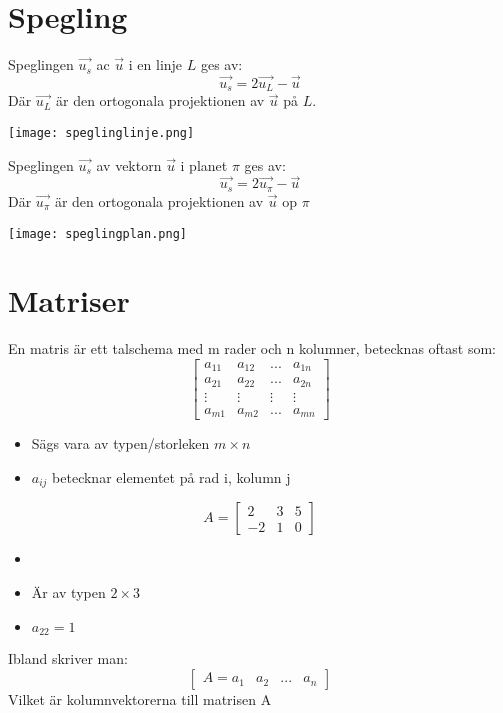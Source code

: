 

\section{Spegling} %
\label{sec:spegling_i_linje}
\begin{Def}
    Speglingen $\vec{u_s}$ ac $\vec{u}$	 i en linje $L$ ges av:
    \[
        \vec{u_s} = 2 \vec{u_L} - \vec{u}
    \]
    Där $\vec{u_L}$ är den ortogonala projektionen av $\vec{u}$ på $L$.
    \begin{center}
    	\texttt{[image: speglinglinje.png]}
    \end{center}
\end{Def}
\begin{Def}
    Speglingen $\vec{u_s}$ av vektorn $\vec{u}$ i planet $\pi$ ges av:
    \[
        \vec{u_s} = 2 \vec{u_\pi} - \vec{u} 
    \]
    Där $\vec{u_\pi}$ är den ortogonala projektionen av $\vec{u}$ op $\pi$
    \begin{center}
    	\texttt{[image: speglingplan.png]}
    \end{center}
\end{Def}
\newpage
\section{Matriser} %
\label{sec:matriser}
En matris är ett talschema med m rader och n kolumner, betecknas oftast som:
\[
    \begin{bmatrix} a_{11} &a_{12} &... &a_{1n}\\a_{21} &a_{22} &... &a_{2n}\\ \vdots &\vdots &\vdots &\vdots\\ a_{m1} &a_{m2} &... &a_{mn} \end{bmatrix}
\]
\begin{itemize}
	\item Sägs vara av typen/storleken $m \times n$
	\item $a_{ij}$ betecknar elementet på rad i, kolumn j
\end{itemize}
\begin{Ex}
    \[
        A = \begin{bmatrix} 2&3&5\\-2&1&0 \end{bmatrix}
    \]
    \begin{itemize}
    	\item 
    	\item Är av typen $2 \times 3$
    	\item $a_{22} = 1$
    \end{itemize}
\end{Ex}
Ibland skriver man:
\[
    \begin{bmatrix} A = a_1&a_2&...&a_n \end{bmatrix}
\]
Vilket är kolumnvektorerna till matrisen A

